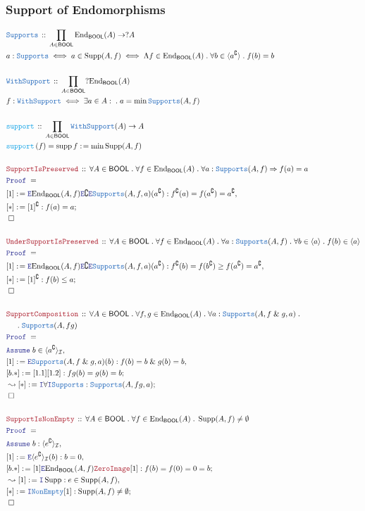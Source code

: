 \documentclass[12pt]{scrartcl}
\newcommand{\TYPE}[1]{\textcolor{NavyBlue}{\mathtt{#1}}}
\newcommand{\FUNC}[1]{\textcolor{Cerulean}{\mathtt{#1}}}
\newcommand{\LOGIC}[1]{\textcolor{Blue}{\mathtt{#1}}}
\newcommand{\THM}[1]{\textcolor{Maroon}{\mathtt{#1}}}
\renewcommand{\.}{\; . \;}
\newcommand{\de}{: \kern 0.1pc =}
\newcommand{\Act}[1]{\left( #1 \right)}
\newcommand{\Theorem}[2]{& \THM{#1} \, :: \, #2 \\ & \Proof = \\ }
\newcommand{\DeclareType}[2]{& \TYPE{#1} \, :: \, #2 \\}
\newcommand{\DefineType}[3]{& #1 : \TYPE{#2} \iff #3 \\}
\newcommand{\DefineNamedType}[4]{& #1 : \TYPE{#2} \iff #3 \iff #4 \\}
\newcommand{\DeclareFunc}[2]{& \FUNC{#1} \, :: \, #2 \\}
\newcommand{\DefineNamedFunc}[4]{&  \FUNC{#1}\Act{#2} = #3 \de #4 \\}
\newcommand{\NewLine}{\\ & \kern 1pc}
\newcommand{\Page}[1]{ \begin{align*} #1 \end{align*}   }
\renewcommand{\And}{\; \& \;}
\newcommand{\Imply}{\Rightarrow}
\newcommand{\Intro}{\LOGIC{I}}
\newcommand{\Elim}{\LOGIC{E}}
\DeclareMathOperator*{\supp}{supp}
\newcommand{\End}{\mathrm{End}}
\renewcommand{\c}{\complement}
\newcommand{\Say}[3]{& #1 \de #2 : #3, \\}
\newcommand{\Conclude}[3]{& #1 \de #2 : #3; \\}
\newcommand{\Derive}[3]{& \leadsto #1 \de #2 : #3, \\}
\newcommand{\DeriveConclude}[3]{& \leadsto #1 \de #2 : #3 ; \\}
\newcommand{\Assume}[2]{& \LOGIC{Assume} \; #1 : #2, \\}
\newcommand{\AssumeIn}[2]{& \LOGIC{Assume} \; #1 \in #2, \\}
\newcommand{\QED}{\; \square}
\newcommand{\EndProof}{& \QED \\}
\newcommand{\Proof}{\LOGIC{Proof} \; }
\newcommand{\I}{\mathcal{I}}
\DeclareMathOperator{\Supp}{Supp}
\newcommand{\BOOL}{\mathsf{BOOL}}
\begin{document}
\subsubsection{Support of Endomorphisms}
\Page{
	\DeclareType{Supports}{\prod_{A \in \BOOL} \End_{\BOOL}(A) \to ?A}
	\DefineNamedType{a}{Supports}{a \in \Supp(A,f)}{
		\Lambda f \in \End_{\BOOL}(A) \. 
		\forall b \in \langle a^\c \rangle \.
		f(b) = b
	}
	\\
	\DeclareType{WithSupport}{\prod_{A \in \BOOL} ?\End_{\BOOL}(A)}
	\DefineType{f}{WithSupport}{\exists a \in A : \. a = \min \TYPE{Supports}(A,f) }
	\\
	\DeclareFunc{support}{\prod_{A \in \BOOL}\TYPE{WithSupport}(A) \to A}
	\DefineNamedFunc{support}{f}{\supp f}{ \min \Supp(A,f)}
	\\
	\Theorem{SupportIsPreserved}
	{
		\forall A \in \BOOL \.
		\forall f \in \End_\BOOL(A) \.
		\forall a : \TYPE{Supports}(A,f)
		\Imply
		f(a) = a
	}
	\Say{[1]}{\Elim \End_\BOOL(A,f) \Elim \c \Elim \TYPE{Supports}(A,f,a)(a^\c)}
	{
		f^\c(a) = f(a^\c) = a^\c
	}
	\Conclude{[*]}{[1]^\c}{f(a) = a}
	\EndProof
	\\
	\Theorem{UnderSupportIsPreserved}
	{
		\forall A \in \BOOL \.
		\forall f \in \End_\BOOL(A) \.
		\forall a : \TYPE{Supports}(A,f) \.
		\forall b \in \langle a \rangle \.
		f(b) \in  \langle a \rangle
	}
	\Say{[1]}{\Elim \End_\BOOL(A,f) \Elim \c \Elim \TYPE{Supports}(A,f,a)(a^\c)}
	{
		 f^\c(b) = f(b^\c) \ge  f(a^\c) = a^\c
	}
	\Conclude{[*]}{[1]^\c}{f(b) \le a}
	\EndProof
	\\
	\Theorem{SupportComposition}
	{
		\forall A \in \BOOL \.
		\forall f,g \in \End_\BOOL(A) \.
		\forall a : \TYPE{Supports}(A,  f \And g, a) \. \NewLine \.
		\TYPE{Supports}(A,fg)
	}
	\AssumeIn{b}{\langle a^\c \rangle_\I}
	\Say{[1]}{\Elim \TYPE{Supports}(A,f \And g,a)(b)}
	{
		f(b) = b \And g(b) = b
	}
	\Conclude{[b.*]}{[1.1][1.2]}
	{
		fg(b) = g(b) = b
	}
	\DeriveConclude{[*]}{\Intro \forall \Intro \TYPE{Supports}}
	{
		\TYPE{Supports}(A,fg,a)
	}
	\EndProof
	\\
	\Theorem{SupportIsNonEmpty}
	{
		\forall A \in \BOOL \. 
		\forall f \in \End_\BOOL(A) \.
		\Supp(A,f) \neq \emptyset
	}
	\Assume{b}{\langle e^\c \rangle_\I}
	\Say{[1]}{\Elim \langle e^\c \rangle_\I (b)}{b = 0}
	\Conclude{[b.*]}
	{
		[1] \Elim \End_\BOOL(A,f)\THM{ZeroImage}[1]
	}
	{
		f(b) = f(0) = 0	= b
	}
	\Derive{[1]}{\Intro \Supp}{e \in \Supp(A,f)}
	\Conclude{[*]}{\Intro \TYPE{NonEmpty}[1]}{\Supp(A,f) \neq \emptyset}
	\EndProof
}
\end{document}
